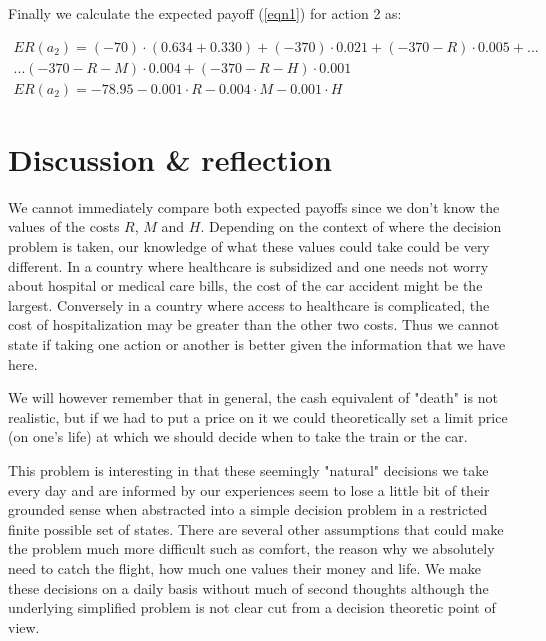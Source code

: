 \documentclass[letterpaper,12pt]{article}
\begin{document}
Finally we calculate the expected payoff (\ref{eqn1}) for action 2 as:

\begin{align*}
ER(a_2) = (-70) \cdot (0.634 + 0.330) + (-370) \cdot 0.021 + (-370 - R) \cdot 0.005 + ... \\ 
... (-370 - R - M) \cdot 0.004 + (-370 - R - H) \cdot 0.001 \\
ER(a_2) = -78.95 - 0.001 \cdot R - 0.004 \cdot M - 0.001 \cdot H
\end{align*}

\section{Discussion \& reflection}

We cannot immediately compare both expected payoffs since we don't know the values of the costs $R$, $M$ and $H$. Depending on the context of where the decision problem is taken, our knowledge of what these values could take could be very different. In a country where healthcare is subsidized and one needs not worry about hospital or medical care bills, the cost of the car accident might be the largest. Conversely in a country where access to healthcare is complicated, the cost of hospitalization may be greater than the other two costs. Thus we cannot state if taking one action or another is better given the information that we have here.

We will however remember that in general, the cash equivalent of "death" is not realistic, but if we had to put a price on it we could theoretically set a limit price (on one's life) at which we should decide when to take the train or the car.

This problem is interesting in that these seemingly "natural" decisions we take every day and are informed by our experiences seem to lose a little bit of their grounded sense when abstracted into a simple decision problem in a restricted finite possible set of states. There are several other assumptions that could make the problem much more difficult such as comfort, the reason why we absolutely need to catch the flight, how much one values their money and life. We make these decisions on a daily basis without much of second thoughts although the underlying simplified problem is not clear cut from a decision theoretic point of view.
\end{document}
